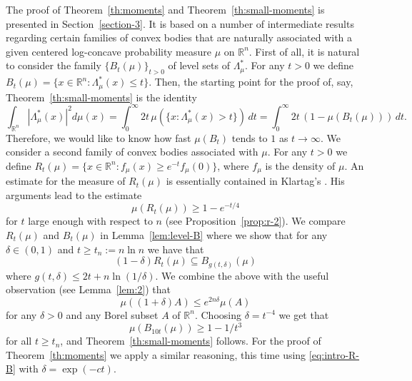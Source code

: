 \documentclass[11pt,leqno]{article}
\theoremstyle{definition}
\theoremstyle{remark}
\numberwithin{equation}{section}
\newcommand{\ls}{\leqslant}
\newcommand{\gr}{\geqslant}
\newcommand{\1}{\textbf{1}}
\begin{document}
The proof of Theorem~\ref{th:moments} and Theorem~\ref{th:small-moments} is presented in Section~\ref{section-3}.
It is based on a number of intermediate results regarding certain families of convex bodies that are naturally associated
with a given centered log-concave probability measure $\mu$ on $\mathbb{R}^n$. First of all, it is natural to consider
the family $\{B_t(\mu)\}_{t>0}$ of level sets of $\Lambda_{\mu}^{\ast}$. For any $t>0$ we define
$B_t(\mu)=\{x\in\mathbb{R}^n:\Lambda_{\mu}^{\ast}(x)\ls t\}$. Then, the starting point for the
proof of, say, Theorem~\ref{th:small-moments} is the identity
$$\int_{{\mathbb R}^n}|\Lambda_{\mu}^{\ast}(x)|^2d\mu(x)=\int_0^{\infty}2t\,\mu(\{x:\Lambda_{\mu}^{\ast}(x)>t\})\,dt
=\int_0^{\infty}2t\,(1-\mu(B_t(\mu)))\,dt.$$
Therefore, we would like to know how fast $\mu(B_t)$ tends to $1$ as $t\to\infty$. We consider a second
family of convex bodies associated with $\mu$. For any $t>0$ we define
$R_t(\mu )=\{x\in {\mathbb R}^n:f_{\mu }(x)\gr e^{-t}f_{\mu }(0)\}$,
where $f_{\mu}$ is the density of $\mu$. An estimate for the measure of $R_t(\mu)$ is essentially
contained in Klartag's \cite[Lemma~5.2]{Klartag-2007clt}. His arguments lead to the estimate
$$\mu(R_t(\mu ))\gr 1-e^{-t/4}$$
for $t$ large enough with respect to $n$ (see Proposition~\ref{prop:r-2}). We compare $R_t(\mu)$
and $B_t(\mu)$ in Lemma~\ref{lem:level-B} where we show that for any $\delta\in (0,1)$ and $t\gr t_n:=n\ln n$ we have that
\begin{equation}\label{eq:intro-R-B}(1-\delta)R_t(\mu)\subseteq B_{g(t,\delta)}(\mu)\end{equation}
where $g(t,\delta)\ls 2t+n\ln(1/\delta)$. We combine the above with the useful observation (see Lemma~\ref{lem:2}) that
$$\mu((1+\delta)A)\ls e^{2n\delta }\mu(A)$$
for any $\delta>0$ and any Borel subset $A$ of $\mathbb{R}^n$. Choosing $\delta =t^{-4}$ we get that
$$\mu(B_{10t}(\mu))\gr 1-1/t^3$$
for all $t\gr t_n$, and Theorem~\ref{th:small-moments} follows. For the proof of Theorem~\ref{th:moments} we
apply a similar reasoning, this time using \eqref{eq:intro-R-B} with $\delta =\exp(-ct)$.
\end{document}
